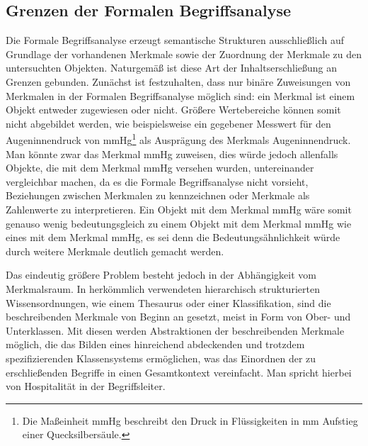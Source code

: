 \documentclass[pagesize,paper=A4,DIV=calc,fontsize=12pt,draft=false]{scrreprt}
\begin{document}
\subsection{Grenzen der Formalen Begriffsanalyse}

Die Formale Begriffsanalyse erzeugt semantische Strukturen ausschließlich auf Grundlage der vorhandenen Merkmale sowie der Zuordnung der Merkmale zu den untersuchten Objekten. 
Naturgemäß ist diese Art der Inhaltserschließung an Grenzen gebunden. 
Zunächst ist festzuhalten, dass nur binäre Zuweisungen von Merkmalen in der Formalen Begriffsanalyse möglich sind: ein Merkmal ist einem Objekt entweder zugewiesen oder nicht. 
Größere Wertebereiche können somit nicht abgebildet werden, wie beispielsweise ein gegebener Messwert für den Augeninnendruck von \unit[17]{mmHg}\footnote{Die Maßeinheit \unit[]{mmHg} beschreibt den Druck in Flüssigkeiten in \unit[]{mm} Aufstieg einer Quecksilbersäule.} als Ausprägung des Merkmals Augeninnendruck. 
Man könnte zwar das Merkmal \unit[17]{mmHg} zuweisen, dies würde jedoch allenfalls Objekte, die mit dem Merkmal \unit[17]{mmHg} versehen wurden, untereinander vergleichbar machen, da es die Formale Begriffsanalyse nicht vorsieht, Beziehungen zwischen Merkmalen zu kennzeichnen oder Merkmale als Zahlenwerte zu interpretieren. 
Ein Objekt mit dem Merkmal \unit[16]{mmHg} wäre somit genauso wenig bedeutungsgleich zu einem Objekt mit dem Merkmal \unit[17]{mmHg} wie eines mit dem Merkmal \unit[6] {mmHg}, es sei denn die Bedeutungsähnlichkeit würde durch weitere Merkmale deutlich gemacht werden. 

Das eindeutig größere Problem besteht jedoch in der Abhängigkeit vom Merkmalsraum. 
In herkömmlich verwendeten hierarchisch strukturierten Wissensordnungen, wie einem Thesaurus oder einer Klassifikation, sind die beschreibenden Merkmale von Beginn an gesetzt, meist in Form von Ober- und Unterklassen. 
Mit diesen werden Abstraktionen der beschreibenden Merkmale möglich, die das Bilden eines hinreichend abdeckenden und trotzdem spezifizierenden Klassensystems ermöglichen, was das Einordnen der zu erschließenden Begriffe in einen Gesamtkontext vereinfacht. 
Man spricht hierbei von Hospitalität in der Begriffsleiter. 
\end{document}
